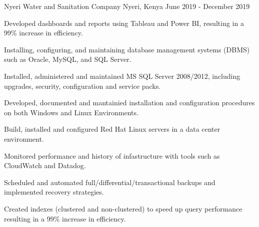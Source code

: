 \begin{cventries}
    {Nyeri Water and Sanitation Company} %
    {Nyeri, Kenya} %
    {June 2019 - December 2019} %
    {
      \begin{cvitems} %
        \item {Developed dashboards and reports using Tableau and Power BI, resulting in a 99\% increase in efficiency.}
        \item {Installing, configuring, and maintaining database management systems (DBMS) such as Oracle, MySQL, and SQL Server.}
        \item {Installed, administered and maintained MS SQL Server 2008/2012, including upgrades, security, configuration and service packs.}
        \item {Developed, documented and mantainied installation and configuration procedures on both Windows and Linux Environments.}
        \item {Build, installed and configured Red Hat Linux servers in a data center environment.}
        \item {Monitored performance and history of infastructure with tools such as CloudWatch and Datadog.}
        \item {Scheduled and automated full/differential/transactional backups and implemented recovery strategies.}
        \item {Created indexes (clustered and non-clustered) to speed up query performance resulting in a 99\% increase in efficiency.}
      \end{cvitems}
    }

\end{cventries}
